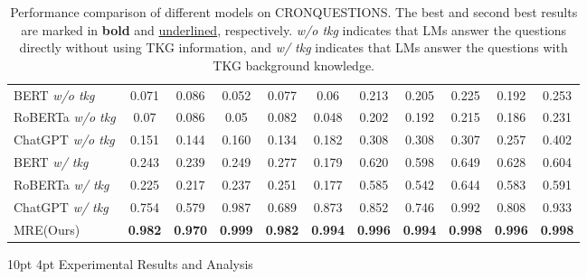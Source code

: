\documentclass[letterpaper]{article} %
\makeatletter
\renewcommand{\section}{%
  \@startsection{section}{1}{\z@}%
  {10pt} %
  {4pt}  %
  {\centering\bfseries\large}%
}
\makeatother
\begin{document}
\begin{table}[ht]
{\begin{tabular}{l|c|c|c|c|c|c|c|c|c|c}
    \cline{1-11}
    BERT \textit{w/o tkg} & 0.071 & 0.086 & 0.052 & 0.077 & 0.06 & 0.213 & 0.205 & 0.225 & 0.192 & 0.253\\
    RoBERTa \textit{w/o tkg}& 0.07 & 0.086 & 0.05 & 0.082 & 0.048 & 0.202 & 0.192 & 0.215 & 0.186 & 0.231\\
    ChatGPT \textit{w/o tkg} & 0.151  & 0.144 & 0.160 & 0.134 &0.182  & 0.308 & 0.308 & 0.307 & 0.257 & 0.402\\
    \cline{1-11}
    BERT \textit{w/ tkg} & 0.243 & 0.239 & 0.249 & 0.277 & 0.179 & 0.620 & 0.598 & 0.649 & 0.628 & 0.604\\
    RoBERTa \textit{w/ tkg} & 0.225 & 0.217 & 0.237 & 0.251 & 0.177 & 0.585 & 0.542 & 0.644 & 0.583 & 0.591\\
    ChatGPT \textit{w/ tkg} & 0.754  & 0.579 & 0.987 & 0.689 &0.873&0.852  & 0.746 & 0.992 & 0.808 & 0.933\\
    \cline{1-11}
    \rowcolor{gray!20}
    MRE(Ours) & \textbf{0.982}&\textbf{0.970}&\textbf{0.999}&\textbf{0.982}&\textbf{0.994}&\textbf{0.996}&\textbf{0.994}&\textbf{0.998}&\textbf{0.996}&\textbf{0.998}\\
    \bottomrule
    \end{tabular}}
    \caption{Performance comparison of different models on CRONQUESTIONS. The best and second best results are marked in \textbf{bold} and \underline{underlined}, respectively.
    \textit{w/o tkg} indicates that LMs answer the questions directly without using TKG information, and \textit{w/ tkg} indicates that LMs answer the questions with TKG background knowledge.}
\label{tab:main result}
\end{table}



\section{Experimental Results and Analysis}
\label{sec:experiments}
\end{document}
